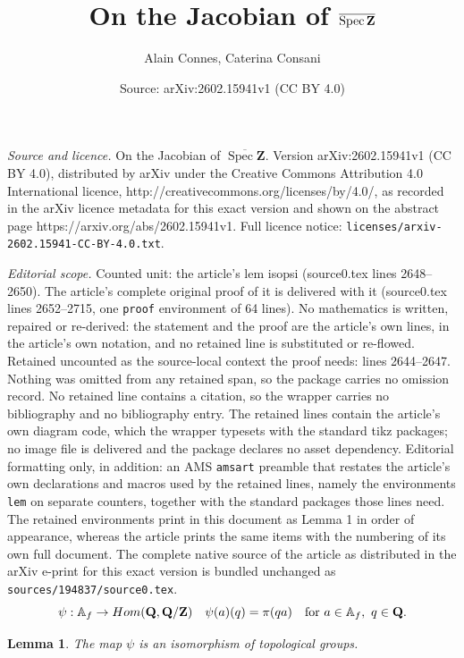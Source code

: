 \documentclass[10pt,a4paper]{amsart}
\title{On the Jacobian of $\spzb$}
\author{Alain Connes, Caterina Consani}
\date{Source: arXiv:2602.15941v1 (CC BY 4.0)}
\newcommand{\Spec}{\operatorname{Spec}}
\def\spzb{\overline{\Spec \Z}}
\newtheorem{lem}{Lemma}
\newcommand{\A}{\mathbb{A}}
\def\Hom{\rm{Hom}}
\newcommand{\Q}{\mathbf{Q}}
\newcommand{\Z}{\mathbf{Z}}
\begin{document}
\maketitle

\noindent\emph{Source and licence.} On the Jacobian of $\spzb$. Version arXiv:2602.15941v1 (CC BY 4.0), distributed by arXiv under the Creative Commons Attribution 4.0 International licence, http://creativecommons.org/licenses/by/4.0/, as recorded in the arXiv licence metadata for this exact version and shown on the abstract page https://arxiv.org/abs/2602.15941v1. Full licence notice: \texttt{licenses/arxiv-2602.15941-CC-BY-4.0.txt}.\par\smallskip

\noindent\textit{Editorial scope.} Counted unit: the article's lem isopsi (source0.tex lines 2648--2650). The article's complete original proof of it is delivered with it (source0.tex lines 2652--2715, one \texttt{proof} environment of 64 lines). No mathematics is written, repaired or re-derived: the statement and the proof are the article's own lines, in the article's own notation, and no retained line is substituted or re-flowed.  Retained uncounted as the source-local context the proof needs: lines 2644--2647.  Nothing was omitted from any retained span, so the package carries no omission record.  No retained line contains a citation, so the wrapper carries no bibliography and no bibliography entry.  The retained lines contain the article's own diagram code, which the wrapper typesets with the standard tikz packages; no image file is delivered and the package declares no asset dependency.  Editorial formatting only, in addition: an AMS \texttt{amsart} preamble that restates the article's own declarations and macros used by the retained lines, namely the environments \texttt{lem} on separate counters, together with the standard packages those lines need.  The retained environments print in this document as Lemma 1 in order of appearance, whereas the article prints the same items with the numbering of its own full document.  The complete native source of the article as distributed in the arXiv e-print for this exact version is bundled unchanged as \texttt{sources/194837/source0.tex}.
\begin{equation} \label{quotad1}
\psi: \A_f \to \Hom(\Q, \Q/\Z)\quad 
\psi(a)(q) = \pi(qa) \quad \text{for } a \in \A_f,~ q \in \Q.
\end{equation}

\begin{lem}\label{isopsi}
The map $\psi$ is an isomorphism of topological groups.
\end{lem}
\end{document}
